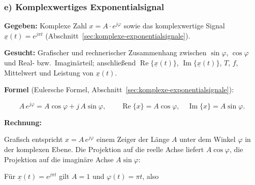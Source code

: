 \subsubsection*{e) Komplexwertiges Exponentialsignal}

\begin{beispiel}

\textbf{Gegeben:} Komplexe Zahl $x = A\cdot e^{j\varphi}$ sowie das
komplexwertige Signal $\underline{x}(t) = e^{j\pi t}$
(Abschnitt~\ref{sec:komplexe-exponentialsignale}).

\textbf{Gesucht:} Grafischer und rechnerischer Zusammenhang zwischen
$\sin\varphi$, $\cos\varphi$ und Real- bzw.\ Imaginärteil; anschließend
$\operatorname{Re}\{\underline{x}(t)\}$, $\operatorname{Im}\{\underline{x}(t)\}$,
$T$, $f$, Mittelwert und Leistung von $\underline{x}(t)$.

\textbf{Formel} (Eulersche Formel, Abschnitt~\ref{sec:komplexe-exponentialsignale}):

$$
A\, e^{j\varphi} = A\cos\varphi + j\,A\sin\varphi,
\qquad
\operatorname{Re}\{x\} = A\cos\varphi, \quad
\operatorname{Im}\{x\} = A\sin\varphi.
$$

\textbf{Rechnung:}

Grafisch entspricht $x = A\,e^{j\varphi}$ einem Zeiger der Länge $A$ unter dem
Winkel $\varphi$ in der komplexen Ebene. Die Projektion auf die reelle Achse
liefert $A\cos\varphi$, die Projektion auf die imaginäre Achse $A\sin\varphi$:

\begin{center}
\end{center}

Für $\underline{x}(t) = e^{j\pi t}$ gilt $A = 1$ und $\varphi(t) = \pi t$, also


\end{beispiel}
